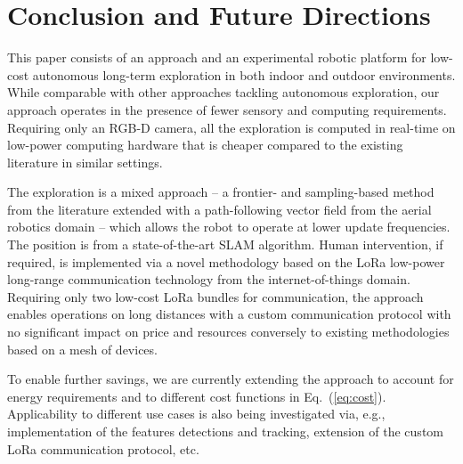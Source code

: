 \documentclass[letterpaper,10pt,conference,twoside]{IEEEtran}
\theoremstyle{definition}
\begin{document}
\section{Conclusion and Future Directions}
\label{sec:cf}
\noindent
This paper consists of an %
approach and an experimental robotic platform 
for low-cost autonomous long-term exploration in both indoor and outdoor %
environments. While comparable with other %
approaches tackling autonomous exploration, %
our approach %
operates in the presence of fewer sensory and computing requirements. Requiring only an RGB-D camera, all the exploration is computed in real-time on low-power computing hardware that is cheaper compared to the existing literature %
in similar settings.%

The exploration is %
a %
mixed approach -- a frontier- and sampling-based method from the literature 
extended with a path-following vector field %
from the aerial robotics domain 
-- which allows the robot to operate at lower update frequencies. The position is from a state-of-the-art SLAM algorithm. %
Human intervention, if required, is implemented via a novel methodology based on the LoRa low-power long-range communication technology %
from the internet-of-things domain. 
Requiring only two low-cost LoRa bundles for communication, the approach enables operations on long distances with a custom communication protocol with no significant impact on price and resources conversely to existing methodologies based on a mesh of devices. %

To enable further savings, we are currently extending the approach to account for energy requirements and to %
different cost functions in Eq.~(\ref{eq:cost}). Applicability to different use cases is also being investigated via, e.g., implementation of the features detections and tracking, extension of the custom LoRa communication protocol, etc. %
\end{document}
